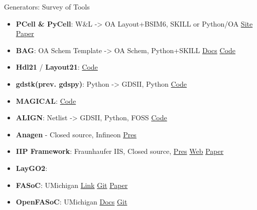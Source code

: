 \begin{frame}{Generators: Survey of Tools}
\protect\hypertarget{generators-survey-of-tools}{}
\begin{itemize}
\tightlist
\item
  \textbf{PCell \& PyCell}: W\&L -\textgreater{} OA Layout+BSIM6, SKILL
  or Python/OA
  \href{https://www.synopsys.com/cgi-bin/pycellstudio/req1.cgi}{Site}
  \href{https://arxiv.org/pdf/1607.00859.pdf}{Paper}
\item
  \textbf{BAG}: OA Schem Template -\textgreater{} OA Schem, Python+SKILL
  \href{https://bag3-readthedocs.readthedocs.io/en/latest/workspaces.html}{Docs}
  \href{https://github.com/ucb-art/bag/tree/without_OA}{Code}
\item
  \textbf{Hdl21} / \textbf{Layout21}:
  \href{https://github.com/dan-fritchman/Hdl21}{Code}
\item
  \textbf{gdstk(prev. gdspy)}: Python -\textgreater{} GDSII, Python
  \href{https://github.com/heitzmann/gdstk}{Code}
\item
  \textbf{MAGICAL}: \href{https://github.com/magical-eda/MAGICAL}{Code}
\item
  \textbf{ALIGN}: Netlist -\textgreater{} GDSII, Python, FOSS
  \href{https://github.com/ALIGN-analoglayout/ALIGN-public}{Code}
\item
  \textbf{Anagen} - Closed source, Infineon
  \href{https://m.youtube.com/watch?v=IzJbVG-FHJc}{Pres}
\item
  \textbf{IIP Framework}: Fraunhaufer IIS, Closed source,
  \href{https://publica-rest.fraunhofer.de/server/api/core/bitstreams/c8d21689-7db1-405f-b1b8-a2298eedf7a3/content}{Pres}
  \href{https://www.eas.iis.fraunhofer.de/en/business_areas/efficient_electronics/automation-analog-design.html}{Web}
  \href{https://ieeexplore.ieee.org/document/7520725}{Paper}
\item
  \textbf{LayGO2}:
\item
  \textbf{FASoC}: UMichigan \href{https://fasoc.engin.umich.edu/}{Link}
  \href{https://github.com/idea-fasoc/fasoc}{Git}
  \href{https://ieeexplore.ieee.org/document/9344104/authors\#authors}{Paper}
\item
  \textbf{OpenFASoC}: UMichigan
  \href{https://openfasoc.readthedocs.io/en/latest/getting-started.html}{Docs}
  \href{https://github.com/idea-fasoc/OpenFASOC}{Git}
\end{itemize}
\end{frame}


